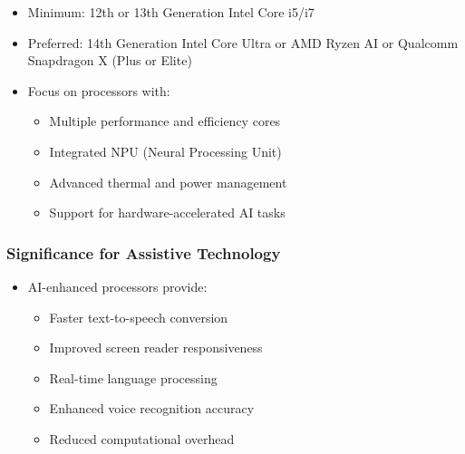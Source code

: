 \begin{enumerate}
	      \begin{itemize}
		      \item Minimum: 12th or 13th Generation Intel Core i5/i7 \supercite{IntelCoreRequirements}
		      \item Preferred: 14th Generation Intel Core Ultra or AMD Ryzen AI or Qualcomm Snapdragon X (Plus or Elite) \supercite{IntelMeteorLake, AMDRyzenAI, QualcommSnapdragonX}
		      \item Focus on processors with:

		            \begin{itemize}
			            \item Multiple performance and efficiency cores \supercite{IntelHybridArchitecture}
			            \item Integrated NPU (Neural Processing Unit) \supercite{IntelNPU, AMDAIProcessing}
			            \item Advanced thermal and power management \supercite{IntelThermalManagement}
			            \item Support for hardware-accelerated AI tasks \supercite{IntelAIAcceleration, AMDAIAcceleration}
		            \end{itemize}

	      \end{itemize}

\end{enumerate}


\subsubsection{Significance for Assistive Technology}

\begin{itemize}
	\item AI-enhanced processors provide:

	      \begin{itemize}
		      \item Faster text-to-speech conversion \supercite{AIinAccessibility}
		      \item Improved screen reader responsiveness \supercite{AIinAccessibility}
		      \item Real-time language processing \supercite{AIinAccessibility}
		      \item Enhanced voice recognition accuracy \supercite{AIinAccessibility}
		      \item Reduced computational overhead \supercite{AIinAccessibility}
	      \end{itemize}

\end{itemize}


